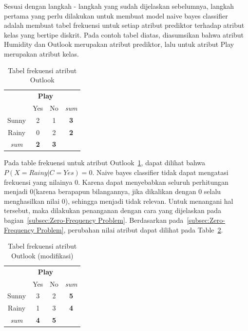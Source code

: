 Sesuai dengan langkah - langkah yang sudah dijelaskan sebelumnya, langkah pertama yang perlu dilakukan untuk membuat model naive bayes classifier adalah membuat tabel frekuensi untuk setiap atribut prediktor terhadap atribut kelas yang bertipe diskrit. Pada contoh tabel diatas, diasumsikan bahwa atribut Humidity dan Outlook merupakan atribut prediktor, lalu untuk atribut Play merupakan atribut kelas.

\begin{table}[ht]
	\centering
	\caption{Tabel frekuensi atribut Outlook}
	\label{tab:2-Table frekuensi atribut Outlook}
	\begin{tabular}{ | c | c | c | c | }
	\hline
	& \multicolumn{2}{c}{\textbf{Play}} & \\ 
	& Yes & No & \textit{sum} \\
	\hline
	Sunny & 2 & 1 & \textbf{3}\\
	\hline
	Rainy & 0 & 2 & \textbf{2} \\
	\hline
	\textit{sum} & \textbf{2} & \textbf{3} & \\
	\hline
	\end{tabular}
\end{table}

Pada table frekuensi untuk atribut Outlook~\ref{tab:2-Table frekuensi atribut Outlook}, dapat dilihat bahwa $P(X=Rainy|C=Yes) = 0$. Naive bayes classifier tidak dapat mengatasi frekuensi yang nilainya 0. Karena dapat menyebabkan seluruh perhitungan menjadi 0(karena berapapun bilangannya, jika dikalikan dengan 0 selalu menghasilkan nilai 0), sehingga menjadi tidak relevan. Untuk menangani hal tersebut, maka dilakukan penanganan dengan cara yang dijelaskan pada bagian~\ref{subsec:Zero-Frequency Problem}. Berdasarkan pada~\ref{subsec:Zero-Frequency Problem}, perubahan nilai atribut dapat dilihat pada Table~\ref{tab:2-Table frekuensi atribut Outlook Modif}.

\begin{table}[ht]
	\centering
	\caption{Tabel frekuensi atribut Outlook (modifikasi)}
	\label{tab:2-Table frekuensi atribut Outlook Modif}
	\begin{tabular}{|c|c|c|c|}
	\hline
	& \multicolumn{2}{c}{\textbf{Play}} & \\
	& Yes & No & \textit{sum} \\ 
	\hline
	Sunny & 3 & 2 & \textbf{5}\\
	\hline
	Rainy & 1 & 3 & \textbf{4} \\
	\hline
	\textit{sum} & \textbf{4} & \textbf{5} & \\
	\hline
	\end{tabular}
\end{table}

